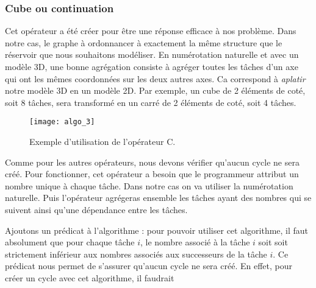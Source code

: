 \subsubsection{Cube ou continuation}
Cet opérateur a été créer pour être une réponse efficace à nos problème.
%
Dans notre cas, le graphe à ordonnancer à exactement la même structure que le réservoir que nous souhaitons modéliser.
%
En numérotation naturelle et avec un modèle 3D, une bonne agrégation consiste à agréger toutes les tâches d'un axe qui ont les mêmes coordonnées sur les deux autres axes.
%
Ca correspond à {\em aplatir} notre modèle 3D en un modèle 2D.
%
Par exemple, un cube de 2 éléments de coté, soit 8 tâches, sera transformé en un carré de 2 éléments de coté, soit 4 tâches.

\begin{figure}[t!]
  \centering
  \texttt{[image: algo\_3]}
  \caption{Exemple d'utilisation de l'opérateur C.}
  \label{fig:algo_C}
\end{figure}

Comme pour les autres opérateurs, nous devons vérifier qu'aucun cycle ne sera créé.
%
Pour fonctionner, cet opérateur a besoin que le programmeur attribut un nombre unique à chaque tâche.
%
Dans notre cas on va utiliser la numérotation naturelle.
%
Puis l'opérateur agrégeras ensemble les tâches ayant des nombres qui se suivent ainsi qu'une dépendance entre les tâches.

Ajoutons un prédicat à l'algorithme : pour pouvoir utiliser cet algorithme, il faut absolument que pour chaque tâche $i$, le nombre associé à la tâche $i$ soit soit strictement inférieur aux nombres associés aux successeurs de la tâche $i$.
%
Ce prédicat nous permet de s'assurer qu'aucun cycle ne sera créé.
%
En effet, pour créer un cycle avec cet algorithme, il faudrait
